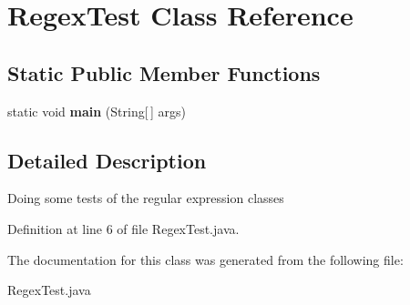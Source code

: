 \section{Regex\-Test Class Reference}
\label{classRegexTest}
\subsection*{Static Public Member Functions}
\begin{CompactItemize}
\item 
static void {\bf main} (String[$\,$] args)\label{classRegexTest_b6b31e8a36e12065e44d06dd6c791f4e}

\end{CompactItemize}


\subsection{Detailed Description}
Doing some tests of the regular expression classes 



Definition at line 6 of file Regex\-Test.java.

The documentation for this class was generated from the following file:\begin{CompactItemize}
\item 
Regex\-Test.java\end{CompactItemize}
